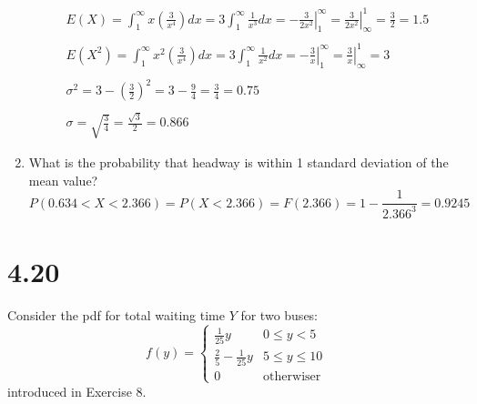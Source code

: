 \documentclass[letterpaper,12pt,fleqn]{article}
\renewcommand{\o}{\sigma}
\begin{document}
\begin{enumerate}[label={\alph*)}]
  \begin{gather*}
    E(X)=\int_1^{\infty}x\left(\frac{3}{x^4}\right)dx=3\int_1^{\infty}\frac{1}{x^3}dx=\left.-\frac{3}{2x^2}\right|_1^{\infty}=
    \left.\frac{3}{2x^2}\right|_{\infty}^1=\frac{3}{2}=1.5 \\
    \\
    E(X^2)=\int_1^{\infty}x^2\left(\frac{3}{x^4}\right)dx=3\int_1^{\infty}\frac{1}{x^2}dx=\left.-\frac{3}{x}\right|_1^{\infty}=
    \left.\frac{3}{x}\right|_{\infty}^1=3 \\
    \\
    \o^2=3-\left(\frac{3}{2}\right)^2=3-\frac{9}{4}=\frac{3}{4}=0.75 \\
    \\
    \o=\sqrt{\frac{3}{4}}=\frac{\sqrt{3}}{2}=0.866
  \end{gather*}
\item What is the probability that headway is within 1 standard deviation of the mean value?
  \[P(0.634<X<2.366)=P(X<2.366)=F(2.366)=1-\frac{1}{2.366^3}=0.9245\]
\end{enumerate}

\section*{4.20}

Consider the pdf for total waiting time \(Y\) for two buses:
\[f(y)=\begin{cases}
\frac{1}{25}y & 0\le y<5 \\
\frac{2}{5}-\frac{1}{25}y & 5\le y \le10 \\
0 & \text{otherwiser}
\end{cases}\]
introduced in Exercise 8.
\end{document}
